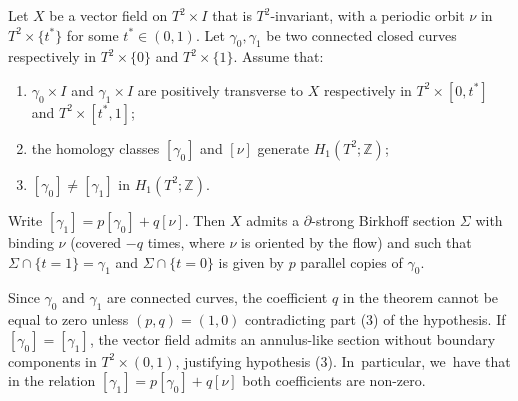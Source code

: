 \begin{prop}\label{prop:helix}
Let $X$ be a vector field on $T^2\times I$ that is $T^2$-invariant, with a periodic orbit $\nu$ in $T^2\times \{t^*\}$ for some $t^*\in(0,1)$. Let $\gamma_0,\gamma_1$ be two connected closed curves respectively in $T^2 \times \{0\}$ and $T^2\times \{1\}$. Assume that:
\begin{enumerate}
\item $\gamma_0\times I$ and $\gamma_1\times I$ are positively transverse to $X$ respectively in $T^2\times [0,t^*]$ and $T^2 \times [t^*,1]$;
\item the homology classes $[\gamma_0]$ and $[\nu]$ generate $H_1(T^2;\mathbb{Z})$;
\item $[\gamma_0]\neq [\gamma_1]$ in $H_1(T^2;\mathbb{Z})$.
\end{enumerate}
Write $[\gamma_1]= p [\gamma_0] + q [\nu]$. Then $X$ admits a $\partial$-strong Birkhoff section $\Sigma$ with binding $\nu$ (covered $-q$ times, where $\nu$ is oriented by the flow) and such that $\Sigma\cap \{t=1\}=\gamma_1$ and $\Sigma \cap \{t=0\}$ is given by $p$ parallel copies of $\gamma_0$.
\end{prop}

{Since $\gamma_0$ and $\gamma_1$ are connected curves, the coefficient $q$ in the theorem cannot be equal to zero unless $(p,q)=(1,0)$ contradicting part (3) of the hypothesis.} If $[\gamma_0]=[\gamma_1]$, the vector field admits an annulus-like section without boundary components in $T^2\times (0,1)$, justifying hypothesis (3). In~particular, we~have that in the relation $[\gamma_1]= p [\gamma_0] + q [\nu]$ both coefficients are non-zero.

